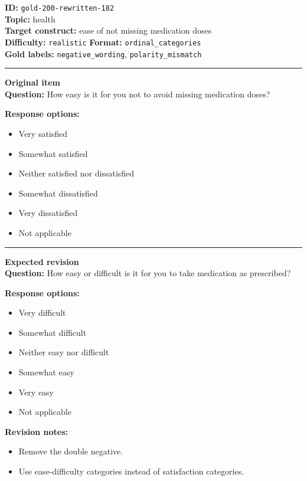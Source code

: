 \documentclass[10pt,a4paper]{article}
\newcommand{\sectionline}{\vspace{0.15em}\hrule\vspace{0.35em}}
\begin{document}
\begin{tcolorbox}[colframe=FlawRed,colback=white,colbacktitle=FlawRed!9,coltitle=black,title={Item 182\hfill Flawed item}]
\textbf{ID:} \texttt{gold-200-rewritten-182}\\
\textbf{Topic:} health\\
\textbf{Target construct:} ease of not missing medication doses\\
\textbf{Difficulty:} \texttt{realistic} \quad \textbf{Format:} \texttt{ordinal\_categories}\\
\textbf{Gold labels:} \texttt{negative\_wording}, \texttt{polarity\_mismatch}\\
\sectionline
\textbf{Original item}\\
\textbf{Question:} How easy is it for you not to avoid missing medication doses?
\par\textbf{Response options:}
\begin{itemize}
\item Very satisfied
\item Somewhat satisfied
\item Neither satisfied nor dissatisfied
\item Somewhat dissatisfied
\item Very dissatisfied
\item Not applicable
\end{itemize}
\sectionline
\textbf{Expected revision}\\
\textbf{Question:} How easy or difficult is it for you to take medication as prescribed?
\par\textbf{Response options:}
\begin{itemize}
\item Very difficult
\item Somewhat difficult
\item Neither easy nor difficult
\item Somewhat easy
\item Very easy
\item Not applicable
\end{itemize}
\par\textbf{Revision notes:}
\begin{itemize}
\item Remove the double negative.
\item Use ease-difficulty categories instead of satisfaction categories.
\end{itemize}
\end{tcolorbox}
\end{document}
